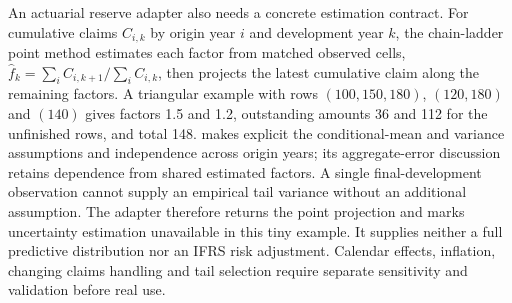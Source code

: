 \enlargethispage{3\baselineskip}
An actuarial reserve adapter also needs a concrete estimation contract.
For cumulative claims $C_{i,k}$ by origin year $i$ and development year $k$,
the chain-ladder point method estimates each factor from matched observed
cells, $\widehat f_k=\sum_i C_{i,k+1}/\sum_i C_{i,k}$, then projects the
latest cumulative claim along the remaining factors. A triangular example
with rows $(100,150,180)$, $(120,180)$ and $(140)$ gives factors 1.5 and
1.2, outstanding amounts 36 and 112 for the unfinished rows, and total 148.
\citet[Sections 2--3, equations (1)--(3)]{mack1993} makes explicit the
conditional-mean and variance assumptions and independence across origin
years; its aggregate-error discussion retains dependence from shared estimated
factors. A single final-development observation cannot supply an empirical
tail variance without an additional assumption. The adapter therefore returns
the point projection and marks uncertainty estimation unavailable in this tiny
example. It supplies neither a full predictive distribution nor an IFRS risk
adjustment. Calendar effects, inflation, changing claims handling and tail
selection require separate sensitivity and validation before real use.


